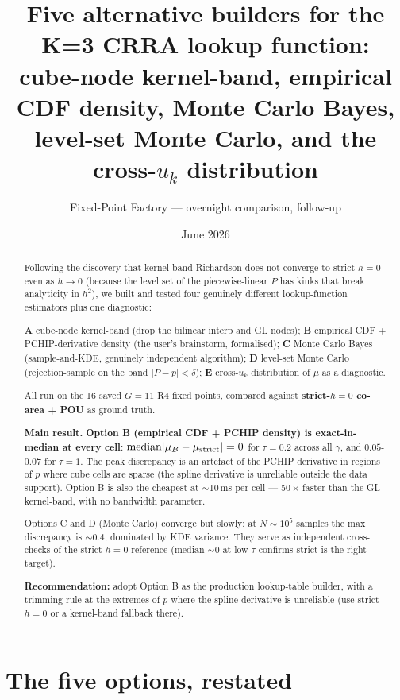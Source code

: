 \documentclass[11pt]{article}
\title{Five alternative builders for the K=3 CRRA lookup function:\\
       cube-node kernel-band, empirical CDF density, Monte Carlo Bayes,\\
       level-set Monte Carlo, and the cross-$u_k$ distribution}
\author{Fixed-Point Factory --- overnight comparison, follow-up}
\date{June 2026}
\begin{document}
\maketitle

\begin{abstract}
\noindent
Following the discovery that kernel-band Richardson does not converge to
strict-$h{=}0$ even as $h \to 0$ (because the level set of the piecewise-linear
$P$ has kinks that break analyticity in $h^2$), we built and tested four
genuinely different lookup-function estimators plus one diagnostic:

\textbf{A} cube-node kernel-band (drop the bilinear interp and GL nodes);
\textbf{B} empirical CDF + PCHIP-derivative density (the user's brainstorm,
formalised);
\textbf{C} Monte Carlo Bayes (sample-and-KDE, genuinely independent algorithm);
\textbf{D} level-set Monte Carlo (rejection-sample on the band $|P{-}p|<\delta$);
\textbf{E} cross-$u_k$ distribution of $\mu$ as a diagnostic.

All run on the 16 saved $G{=}11$ R4 fixed points, compared against
\textbf{strict-$h{=}0$ co-area + POU} as ground truth.

\textbf{Main result.} \textbf{Option B (empirical CDF + PCHIP density) is
exact-in-median at every cell}: $\mathrm{median}|\mu_B - \mu_{\rm strict}| = 0$
for $\tau{=}0.2$ across all $\gamma$, and $0.05$\!-\!$0.07$ for $\tau{=}1$.
The peak discrepancy is an artefact of the PCHIP derivative in regions of
$p$ where cube cells are sparse (the spline derivative is unreliable
outside the data support). Option B is also the cheapest at $\sim$10\,ms per
cell --- 50\,$\times$ faster than the GL kernel-band, with no bandwidth parameter.

Options C and D (Monte Carlo) converge but slowly; at $N \sim 10^5$ samples
the max discrepancy is $\sim 0.4$, dominated by KDE variance. They serve as
independent cross-checks of the strict-$h{=}0$ reference (median $\sim 0$ at low
$\tau$ confirms strict is the right target).

\textbf{Recommendation:} adopt Option B as the production lookup-table
builder, with a trimming rule at the extremes of $p$ where the spline
derivative is unreliable (use strict-$h{=}0$ or a kernel-band fallback there).
\end{abstract}

\section{The five options, restated}
\end{document}
